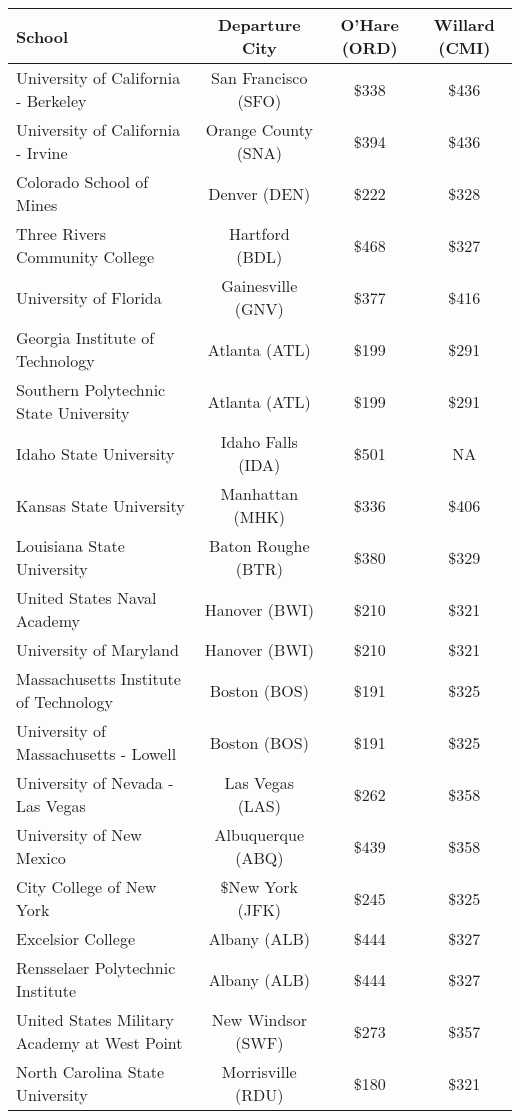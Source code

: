 \begin{center}
   \begin{tabular}{lccc}
    School & Departure City & O'Hare (ORD) &Willard (CMI) \\
    \hline
    University of California - Berkeley & San Francisco (SFO) & $\$$338 & $\$$436 \\
    University of California - Irvine&Orange County (SNA)&$\$$394&$\$$436\\
    Colorado School of Mines & Denver (DEN) & $\$$222 & $\$$328 \\
    Three Rivers Community College & Hartford (BDL) & $\$$468 & $\$$327 \\ 
    University of Florida & Gainesville (GNV)& $\$$377 & $\$$416 \\
    Georgia Institute of Technology & Atlanta (ATL)& $\$$199 & $\$$291 \\
    Southern Polytechnic State University & Atlanta (ATL) & $\$$199 & $\$$291 \\
    Idaho State University & Idaho Falls (IDA) & $\$$501 & NA \\
    Kansas State University & Manhattan (MHK) & $\$$336 & $\$$406 \\ 
    Louisiana State University & Baton Roughe (BTR) & $\$$380 & $\$$329 \\
    United States Naval Academy & Hanover (BWI) & $\$$210 & $\$$321 \\  
    University of Maryland & Hanover (BWI)&$\$$210 &$\$$321 \\ 
    Massachusetts Institute of Technology & Boston (BOS)&$\$$191 &$\$$325 \\ 
    University of Massachusetts - Lowell &Boston (BOS) &$\$$191 &$\$$325 \\
    University of Nevada - Las Vegas & Las Vegas (LAS)& $\$$262 &$\$$358 \\ 
    University of New Mexico &Albuquerque (ABQ) &$\$$439 &$\$$358 \\ 
    City College of New York &$\$$New York (JFK) &$\$$245 &$\$$325 \\
    Excelsior College & Albany (ALB) &$\$$444 &$\$$327 \\ 
    Rensselaer Polytechnic Institute & Albany (ALB)&$\$$444 &$\$$327 \\ 
    United States Military Academy at West Point&New Windsor (SWF)&$\$$273 &$\$$357 \\ 
    North Carolina State University &Morrisville (RDU) &$\$$180 &$\$$321 \\

\end{tabular}
\end{center}
